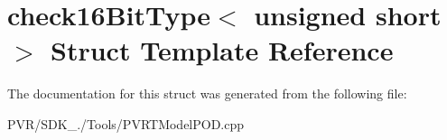 \hypertarget{structcheck16_bit_type_3_01unsigned_01short_01_4}{\section{check16\+Bit\+Type$<$ unsigned short $>$ Struct Template Reference}
\label{structcheck16_bit_type_3_01unsigned_01short_01_4}
}


The documentation for this struct was generated from the following file\+:\begin{DoxyCompactItemize}
\item 
P\+V\+R/\+S\+D\+K\+\_./\+Tools/P\+V\+R\+T\+Model\+P\+O\+D.\+cpp\end{DoxyCompactItemize}
